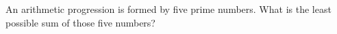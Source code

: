 An arithmetic progression is formed by five prime numbers. What is the least possible sum of those five numbers?
